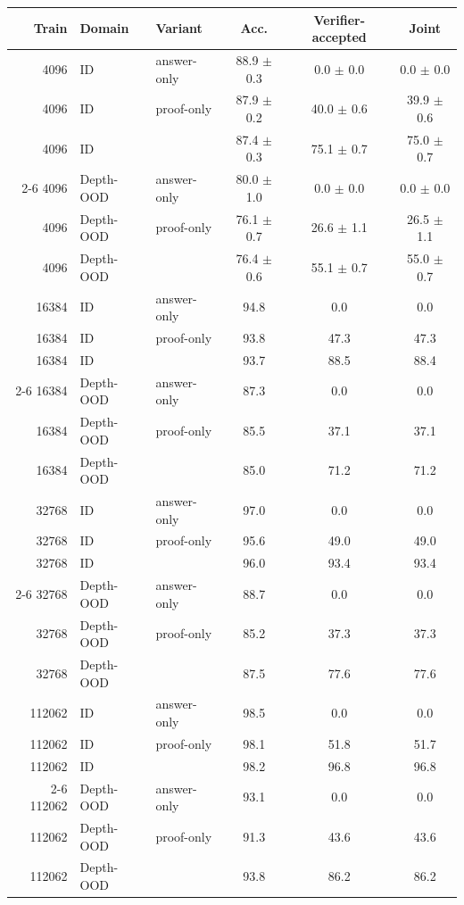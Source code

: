 \begin{tabular}{rllccc}
\toprule
Train & Domain & Variant & Acc. & Verifier-accepted & Joint \\
\midrule
4096 & ID & answer-only & 88.9 $\pm$ 0.3 & 0.0 $\pm$ 0.0 & 0.0 $\pm$ 0.0 \\
4096 & ID & proof-only & 87.9 $\pm$ 0.2 & 40.0 $\pm$ 0.6 & 39.9 $\pm$ 0.6 \\
4096 & ID & \model{} & 87.4 $\pm$ 0.3 & 75.1 $\pm$ 0.7 & 75.0 $\pm$ 0.7 \\
\cmidrule(lr){2-6}
4096 & Depth-OOD & answer-only & 80.0 $\pm$ 1.0 & 0.0 $\pm$ 0.0 & 0.0 $\pm$ 0.0 \\
4096 & Depth-OOD & proof-only & 76.1 $\pm$ 0.7 & 26.6 $\pm$ 1.1 & 26.5 $\pm$ 1.1 \\
4096 & Depth-OOD & \model{} & 76.4 $\pm$ 0.6 & 55.1 $\pm$ 0.7 & 55.0 $\pm$ 0.7 \\
\midrule
16384 & ID & answer-only & 94.8 & 0.0 & 0.0 \\
16384 & ID & proof-only & 93.8 & 47.3 & 47.3 \\
16384 & ID & \model{} & 93.7 & 88.5 & 88.4 \\
\cmidrule(lr){2-6}
16384 & Depth-OOD & answer-only & 87.3 & 0.0 & 0.0 \\
16384 & Depth-OOD & proof-only & 85.5 & 37.1 & 37.1 \\
16384 & Depth-OOD & \model{} & 85.0 & 71.2 & 71.2 \\
\midrule
32768 & ID & answer-only & 97.0 & 0.0 & 0.0 \\
32768 & ID & proof-only & 95.6 & 49.0 & 49.0 \\
32768 & ID & \model{} & 96.0 & 93.4 & 93.4 \\
\cmidrule(lr){2-6}
32768 & Depth-OOD & answer-only & 88.7 & 0.0 & 0.0 \\
32768 & Depth-OOD & proof-only & 85.2 & 37.3 & 37.3 \\
32768 & Depth-OOD & \model{} & 87.5 & 77.6 & 77.6 \\
\midrule
112062 & ID & answer-only & 98.5 & 0.0 & 0.0 \\
112062 & ID & proof-only & 98.1 & 51.8 & 51.7 \\
112062 & ID & \model{} & 98.2 & 96.8 & 96.8 \\
\cmidrule(lr){2-6}
112062 & Depth-OOD & answer-only & 93.1 & 0.0 & 0.0 \\
112062 & Depth-OOD & proof-only & 91.3 & 43.6 & 43.6 \\
112062 & Depth-OOD & \model{} & 93.8 & 86.2 & 86.2 \\
\bottomrule
\end{tabular}